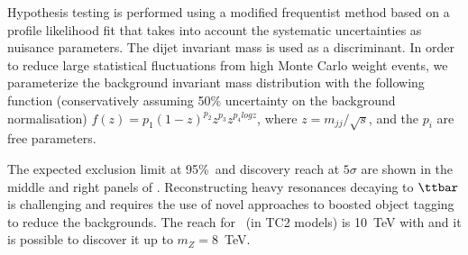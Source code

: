 Hypothesis testing is performed using a modified frequentist method based on a profile likelihood fit that takes into account the systematic uncertainties as nuisance parameters. The dijet invariant mass is used as a discriminant. In order to reduce large statistical fluctuations from high Monte Carlo weight events, we parameterize the background invariant mass distribution with the following function (conservatively assuming 50\% uncertainty on the background normalisation) $f(z)=p_1(1-z)^{p_2}z^{p_3}z^{p_{4}logz}$, where $z=m_{jj}/\sqrt{s}$, and the $p_{i}$ are free parameters.

The expected exclusion limit at 95\%~\cl and discovery reach at $5 \sigma$ are shown in the middle and right panels of . Reconstructing heavy resonances decaying to $\ttbar$ is challenging and requires the use of novel approaches to boosted object tagging to reduce the backgrounds. The reach for \zptt\ (in TC2 models) is 10~TeV with \intlumihelhc and it is possible to discover it up to $m_{Z}=8$~TeV.  

\begin{table}[!htb]\centering
{}
\caption{Final yield of analysis.}
\label{tab:ZpttYield}
\end{table}
